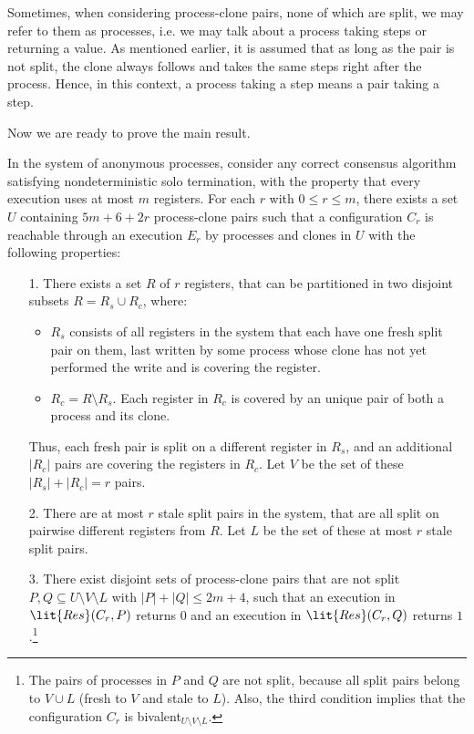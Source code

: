 Sometimes, when considering process-clone pairs, none of which are split, 
  we may refer to them as processes, i.e. we may talk about a process taking steps or returning a value. 
As mentioned earlier, it is assumed that as long as the pair is not split, 
  the clone always follows and takes the same steps right after the process. 
Hence, in this context, a process taking a step means a pair taking a step.   

Now we are ready to prove the main result.
\begin{theorem}
\label{thm:linclone}
In the system of anonymous processes, 
  consider any correct consensus algorithm satisfying nondeterministic solo termination,
  with the property that every execution uses at most $m$ registers.
For each $r$ with $0 \leq r \leq m$, there exists a set $U$ containing $5m+6+2r$ process-clone pairs  
  such that a configuration $C_r$ is reachable through an execution $E_r$ 
  by processes and clones in $U$ with the following properties:
\begin{itemize}[noitemsep, nolistsep]
\item[1.] There exists a set $R$ of $r$ registers, that can be partitioned in two disjoint subsets $R = R_s \cup R_c$, where:
\begin{itemize}[noitemsep, nolistsep]
\item $R_s$ consists of all registers in the system that each have one fresh split pair on them, 
  last written by some process whose clone has not yet performed the write and is covering the register.
\item $R_c = R \setminus R_s$.
Each register in $R_c$ is covered by an unique pair of both a process and its clone.
\end{itemize}
Thus, each fresh pair is split on a different register in $R_s$,
  and an additional $|R_c|$ pairs are covering the registers in $R_c$.
Let $V$ be the set of these $|R_s| + |R_c| = r$ pairs.
\item[2.] There are at most $r$ stale split pairs in the system,
  that are all split on pairwise different registers from $R$.
Let $L$ be the set of these at most $r$ stale split pairs.
\item[3.] There exist disjoint sets of process-clone pairs that are not split 
  $P, Q \subseteq U \setminus V \setminus L$ with $|P| + |Q| \leq 2m+4$,
  such that an execution in $\lit{Res}(C_r, P)$ returns $0$ and an execution in $\lit{Res}(C_r, Q)$ returns $1$.\footnote{The pairs of processes in $P$ and $Q$ are not split, because all split pairs belong to $V \cup L$ (fresh to $V$ and stale to $L$). Also, the third condition implies that the configuration $C_r$ is bivalent$_{U \setminus V \setminus L}$.} 
\end{itemize}
\end{theorem}

